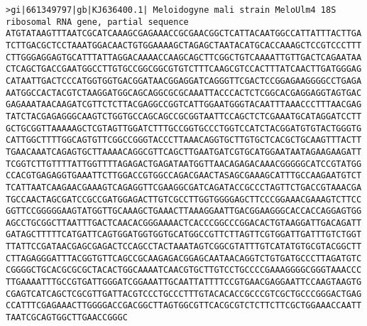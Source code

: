 \documentclass[11pt]{article}
\begin{document}
\begin{Verbatim}[commandchars=\\\{\}]
>gi|661349797|gb|KJ636400.1| Meloidogyne mali strain MeloUlm4 18S ribosomal RNA gene, partial sequence
ATGTATAAGTTTAATCGCATCAAAGCGAGAAACCGCGAACGGCTCATTACAATGGCCATTATTTACTTGA
TCTTGACGCTCCTAAATGGACAACTGTGGAAAAGCTAGAGCTAATACATGCACCAAAGCTCCGTCCCTTT
CTTGGGAGGAGTGCATTTATTAGGACAAAACCAAGCAGCTTCGGCTGTCAAAATTGTTGACTCAGAATAA
CTCAGCTGACCGAATGGCCTTGTGCCGGCGGCGTGTCTTTCAAGCGTCCACTTTATCAACTTGATGGGAG
CATAATTGACTCCCATGGTGGTGACGGATAACGGAGGATCAGGGTTCGACTCCGGAGAAGGGGCCTGAGA
AATGGCCACTACGTCTAAGGATGGCAGCAGGCGCGCAAATTACCCACTCTCGGCACGAGGAGGTAGTGAC
GAGAAATAACAAGATCGTTCTCTTACGAGGCCGGTCATTGGAATGGGTACAATTTAAACCCTTTAACGAG
TATCTACGAGAGGGCAAGTCTGGTGCCAGCAGCCGCGGTAATTCCAGCTCTCGAAATGCATAGGATCCTT
GCTGCGGTTAAAAAGCTCGTAGTTGGATCTTTGCCGGTGCCCTGGTCCATCTACGGATGTGTACTGGGTG
CATTGGCTTTTGGCAGTGTTCGGCCGGGTACCCTTAAACAGGTGCTTGTGCTCACGCTGCAAGTTTACTT
TGAACAAATCAGAGTGCTTAAAACAGGCGTTCAGCTTGAATGATCGTGCATGGAATAATAGAAGAAGATT
TCGGTCTTGTTTTATTGGTTTTAGAGACTGAGATAATGGTTAACAGAGACAAACGGGGGCATCCGTATGG
CCACGTGAGAGGTGAAATTCTTGGACCGTGGCCAGACGAACTASAGCGAAAGCATTTGCCAAGAATGTCT
TCATTAATCAAGAACGAAAGTCAGAGGTTCGAAGGCGATCAGATACCGCCCTAGTTCTGACCGTAAACGA
TGCCAACTAGCGATCCGCCGATGGAGACTTGTCGCCTTGGTGGGGAGCTTCCCGGAAACGAAAGTCTTCC
GGTTCCGGGGGAAGTATGGTTGCAAAGCTGAAACTTAAAGGAATTGACGGAAGGGCACCACCAGGAGTGG
AGCCTGCGGCTTAATTTGACTCAACACGGGAAAACTCACCCGGCCCGGACACTGTAAGGATTGACAGATT
GATAGCTTTTTCATGATTCAGTGGATGGTGGTGCATGGCCGTTCTTAGTTCGTGGATTGATTTGTCTGGT
TTATTCCGATAACGAGCGAGACTCCAGCCTACTAAATAGTCGGCGTATTTGTCATATGTGCGTACGGCTT
CTTAGAGGGATTTACGGTGTTCAGCCGCAAGAGACGGAGCAATAACAGGTCTGTGATGCCCTTAGATGTC
CGGGGCTGCACGCGCGCTACACTGGCAAAATCAACGTGCTTGTCCTGCCCCGAAAGGGGCGGGTAAACCC
TTGAAAATTTGCCGTGATTGGGATCGGAAATTGCAATTATTTTCCGTGAACGAGGAATTCCAAGTAAGTG
CGAGTCATCAGCTCGCGTTGATTACGTCCCTGCCCTTTGTACACACCGCCCGTCGCTGCCCGGGACTGAG
CCATTTCGAGAAACTTGGGGACCGACGGCTTAGTGGCGTTCACGCGTCTCTTCTTCGCTGGAAACCAATT
TAATCGCAGTGGCTTGAACCGGGC


\end{Verbatim}
\end{document}
